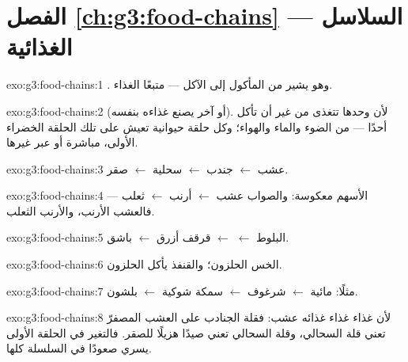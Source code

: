 \section*{الفصل \ref{ch:g3:food-chains} --- السلاسل الغذائية}

\begin{solution}{exo:g3:food-chains:1}
. وهو يشير من المأكول إلى الآكل --- متبعًا الغذاء.
\end{solution}

\begin{solution}{exo:g3:food-chains:2}
 (أو  آخر يصنع غذاءه بنفسه). لأن  وحدها تتغذى
من غير أن تأكل أحدًا --- من الضوء والماء والهواء؛ وكل حلقة
حيوانية تعيش على تلك الحلقة الخضراء الأولى، مباشرة أو عبر غيرها.
\end{solution}

\begin{solution}{exo:g3:food-chains:3}
عشب $\leftarrow$ جندب $\leftarrow$ سحلية
$\leftarrow$ صقر.
\end{solution}

\begin{solution}{exo:g3:food-chains:4}
الأسهم معكوسة: والصواب عشب $\leftarrow$ أرنب
$\leftarrow$ ثعلب --- فالعشب  الأرنب، والأرنب
 الثعلب.
\end{solution}

\begin{solution}{exo:g3:food-chains:5}
 البلوط $\leftarrow$  $\leftarrow$ قرقف أزرق
$\leftarrow$ باشق.
\end{solution}

\begin{solution}{exo:g3:food-chains:6}
الخس  الحلزون؛ والقنفذ يأكل الحلزون.
\end{solution}

\begin{solution}{exo:g3:food-chains:7}
مثلًا:  مائية $\leftarrow$ شرغوف $\leftarrow$
سمكة شوكية $\leftarrow$ بلشون.
\end{solution}

\begin{solution}{exo:g3:food-chains:8}
لأن غذاء غذاء غذائه عشب: فقلة الجنادب على العشب المصفرّ تعني قلة
السحالي، وقلة السحالي تعني صيدًا هزيلًا للصقر. فالتغير في الحلقة
الأولى يسري صعودًا في السلسلة كلها.
\end{solution}

